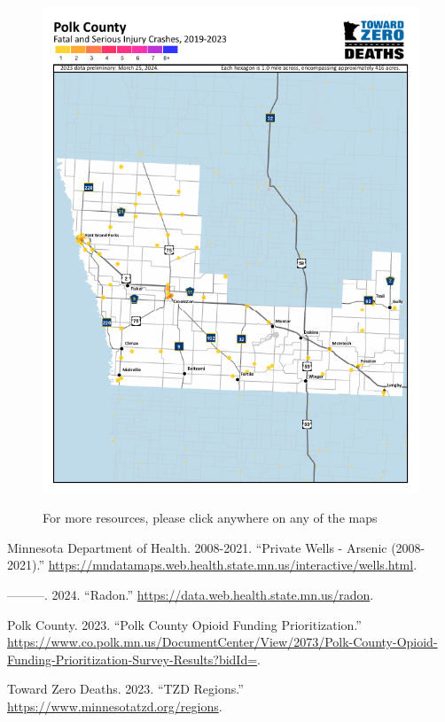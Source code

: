 \documentclass[
  a4paper,
  landscape]{scrreprt}
\newlength{\cslhangindent}
\newenvironment{CSLReferences}[2] %
 {\begin{list}{}{%
  \setlength{\itemindent}{0pt}
  \setlength{\leftmargin}{0pt}
  \setlength{\parsep}{0pt}
  \ifodd #1
   \setlength{\leftmargin}{\cslhangindent}
   \setlength{\itemindent}{-1\cslhangindent}
  \fi
  \setlength{\itemsep}{#2\baselineskip}}}
 {\end{list}}
\begin{document}
\begin{figure}[H]
\begin{minipage}{0.33\linewidth}
\href{https://www.minnesotatzd.org/regions/northwest}{\includegraphics{pages/Attachments/popEnvironmentalHealth/countypolkMap_crashes2019_2023.png}}\end{minipage}%

\caption{\label{fig-seriousCrash}For more resources, please click
anywhere on any of the maps}

\end{figure}%

\label{refs}
\begin{CSLReferences}{1}{0}
Minnesota Department of Health. 2008-2021. {``Private Wells - Arsenic
(2008-2021).''}
\url{https://mndatamaps.web.health.state.mn.us/interactive/wells.html}.

---------. 2024. {``Radon.''}
\url{https://data.web.health.state.mn.us/radon}.

Polk County. 2023. {``Polk County Opioid Funding Prioritization.''}
\url{https://www.co.polk.mn.us/DocumentCenter/View/2073/Polk-County-Opioid-Funding-Prioritization-Survey-Results?bidId=}.

Toward Zero Deaths. 2023. {``TZD Regions.''}
\url{https://www.minnesotatzd.org/regions}.

\end{CSLReferences}
\end{document}
